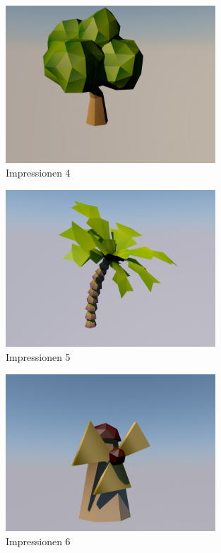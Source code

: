 \begin{figure}[!htbp]%
	\centering
		\includegraphics[width=0.7\textwidth]{images/anhang_4}
	\caption{Impressionen 4}
	\label{fig:Impressionen}
\end{figure}

\begin{figure}[!htbp]%
	\centering
		\includegraphics[width=0.7\textwidth]{images/anhang_5}
	\caption{Impressionen 5}
	\label{fig:Impressionen}
\end{figure}

\begin{figure}[!htbp]%
	\centering
		\includegraphics[width=0.7\textwidth]{images/anhang_6}
	\caption{Impressionen 6}
	\label{fig:Impressionen}
\end{figure}

